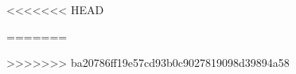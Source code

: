 \documentclass[twoside]{Styles/macthesis}
\begin{document}


\pagestyle{myheadings}



<<<<<<< HEAD


=======
%


>>>>>>> ba20786ff19e57cd93b0c9027819098d39894a58

%
\appendix
%
%


\addtocounter{page}{-1}
\label{finalpage}

\clearpage
%
\end{document}
